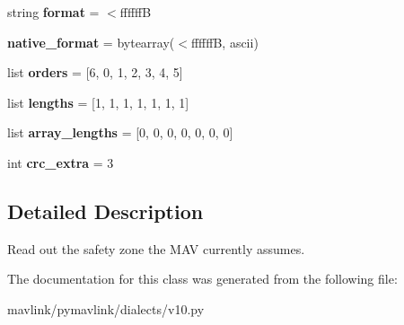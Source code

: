 \begin{DoxyCompactItemize}
string {\bfseries format} = \textquotesingle{}$<$ffffffB\textquotesingle{}
\item 
\mbox{\label{classpymavlink_1_1dialects_1_1v10_1_1MAVLink__safety__allowed__area__message_a54d8ccef5c8239df73f905893ec44f10}} 
{\bfseries native\+\_\+format} = bytearray(\textquotesingle{}$<$ffffffB\textquotesingle{}, \textquotesingle{}ascii\textquotesingle{})
\item 
\mbox{\label{classpymavlink_1_1dialects_1_1v10_1_1MAVLink__safety__allowed__area__message_a58eefe27dc9ec44f01d0722a3d2e022f}} 
list {\bfseries orders} = \mbox{[}6, 0, 1, 2, 3, 4, 5\mbox{]}
\item 
\mbox{\label{classpymavlink_1_1dialects_1_1v10_1_1MAVLink__safety__allowed__area__message_a0f2529a3da3ec256030f7e18f9d25f82}} 
list {\bfseries lengths} = \mbox{[}1, 1, 1, 1, 1, 1, 1\mbox{]}
\item 
\mbox{\label{classpymavlink_1_1dialects_1_1v10_1_1MAVLink__safety__allowed__area__message_a4586498ac2df956eadbd8a1b8671a7bc}} 
list {\bfseries array\+\_\+lengths} = \mbox{[}0, 0, 0, 0, 0, 0, 0\mbox{]}
\item 
\mbox{\label{classpymavlink_1_1dialects_1_1v10_1_1MAVLink__safety__allowed__area__message_a99ce7e03656fef37f196eee1e6ad45d8}} 
int {\bfseries crc\+\_\+extra} = 3
\end{DoxyCompactItemize}


\subsection{Detailed Description}
\begin{DoxyVerb}Read out the safety zone the MAV currently assumes.
\end{DoxyVerb}
 

The documentation for this class was generated from the following file\+:\begin{DoxyCompactItemize}
\item 
mavlink/pymavlink/dialects/v10.\+py\end{DoxyCompactItemize}
